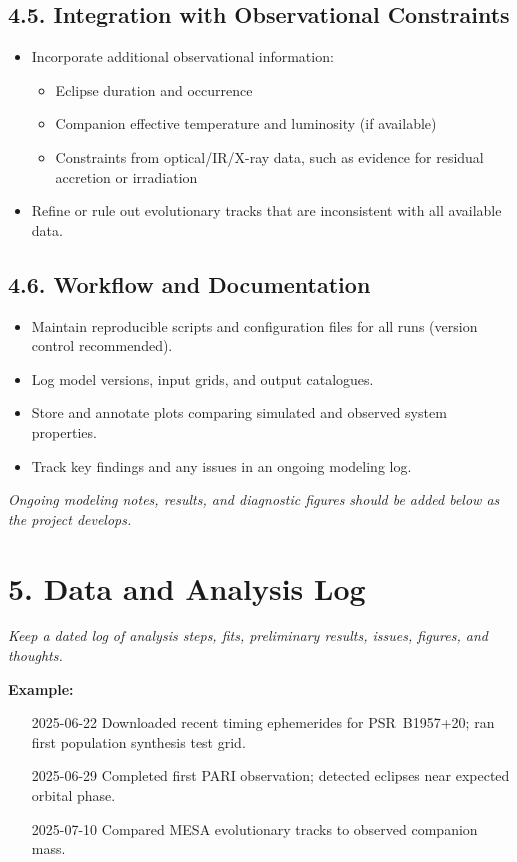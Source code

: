 \documentclass[12pt]{article}
\begin{document}
\subsection*{4.5. Integration with Observational Constraints}
\begin{itemize}
    \item Incorporate additional observational information:
        \begin{itemize}
            \item Eclipse duration and occurrence
            \item Companion effective temperature and luminosity (if available)
            \item Constraints from optical/IR/X-ray data, such as evidence for residual accretion or irradiation
        \end{itemize}
    \item Refine or rule out evolutionary tracks that are inconsistent with all available data.
\end{itemize}

\subsection*{4.6. Workflow and Documentation}
\begin{itemize}
    \item Maintain reproducible scripts and configuration files for all runs (version control recommended).
    \item Log model versions, input grids, and output catalogues.
    \item Store and annotate plots comparing simulated and observed system properties.
    \item Track key findings and any issues in an ongoing modeling log.
\end{itemize}

\textit{Ongoing modeling notes, results, and diagnostic figures should be added below as the project develops.}

\section*{5. Data and Analysis Log}
\textit{Keep a dated log of analysis steps, fits, preliminary results, issues, figures, and thoughts.}

\vspace{1em}
\textbf{Example:}
\begin{itemize}
    \item [2025-06-22] Downloaded recent timing ephemerides for PSR~B1957+20; ran first population synthesis test grid.
    \item [2025-06-29] Completed first PARI observation; detected eclipses near expected orbital phase.
    \item [2025-07-10] Compared MESA evolutionary tracks to observed companion mass.
\end{itemize}
\end{document}
